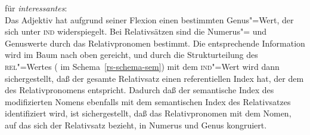 \ea
\locw für \emph{interessantes}:\\
\label{le-interessantes-zwei}%
\z
Das Adjektiv hat aufgrund seiner Flexion einen bestimmten Genus"=Wert, der sich unter
\textsc{ind} widerspiegelt. Bei Relativsätzen sind die Numerus"= und Genuswerte durch das Relativpronomen
bestimmt. Die entsprechende Information wird im Baum nach oben gereicht, und durch die Strukturteilung
des \textsc{rel}"=Wertes ( im Schema~\ref{rs-schema-sem}) mit dem \textsc{ind}"=Wert wird dann sichergestellt, daß der gesamte Relativsatz
einen referentiellen Index hat, der dem des Relativpronomens entspricht. Dadurch daß der semantische
Index des modifizierten Nomens ebenfalls mit dem semantischen Index des Relativsatzes identifiziert wird,
ist sichergestellt, daß das Relativpronomen mit dem Nomen, auf das sich der Relativsatz bezieht, in
Numerus und Genus kongruiert.

